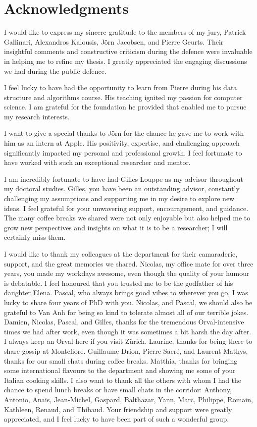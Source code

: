 
\chapter*{Acknowledgments}
I would like to express my sincere gratitude to the members of my jury, Patrick Gallinari, Alexandros Kalousis, Jörn Jacobsen, and Pierre Geurts. Their insightful comments and constructive criticism during the defence were invaluable in helping me to refine my thesis. I greatly appreciated the engaging discussions we had during the public defence.

I feel lucky to have had the opportunity to learn from Pierre during his data structure and algorithms course. His teaching ignited my passion for computer science. I am grateful for the foundation he provided that enabled me to pursue my research interests.

I want to give a special thanks to Jörn for the chance he gave me to work with him as an intern at Apple. His positivity, expertise, and challenging approach significantly impacted my personal and professional growth. I feel fortunate to have worked with such an exceptional researcher and mentor.

I am incredibly fortunate to have had Gilles Louppe as my advisor throughout my doctoral studies. Gilles, you have been an outstanding advisor, constantly challenging my assumptions and supporting me in my desire to explore new ideas. I feel grateful for your unwavering support, encouragement, and guidance. The many coffee breaks we shared were not only enjoyable but also helped me to grow new perspectives and insights on what it is to be a researcher; I will certainly miss them.

I would like to thank my colleagues at the department for their camaraderie, support, and the great memories we shared. Nicolas, my office mate for over three years, you made my workdays awesome, even though the quality of your humour is debatable. I feel honoured that you trusted me to be the godfather of his daughter Elena. Pascal, who always brings good vibes to wherever you go, I was lucky to share four years of PhD with you. Nicolas, and Pascal, we should also be grateful to Van Anh for being so kind to tolerate almost all of our terrible jokes. Damien, Nicolas, Pascal, and Gilles, thanks for the tremendous Orval-intensive times we had after work, even though it was sometimes a bit harsh the day after. I always keep an Orval here if you visit Zürich. Laurine, thanks for being there to share gossip at Montefiore. Guillaume Drion, Pierre Sacré, and Laurent Mathys, thanks for our small chats during coffee breaks. Matthia, thanks for bringing some international flavours to the department and showing me some of your Italian cooking skills. I also want to thank all the others with whom I had the chance to spend lunch breaks or have small chats in the corridor: Anthony, Antonio, Anaïs, Jean-Michel, Gaspard, Balthazar, Yann, Marc, Philippe, Romain, Kathleen, Renaud, and Thibaud. Your friendship and support were greatly appreciated, and I feel lucky to have been part of such a wonderful group.

